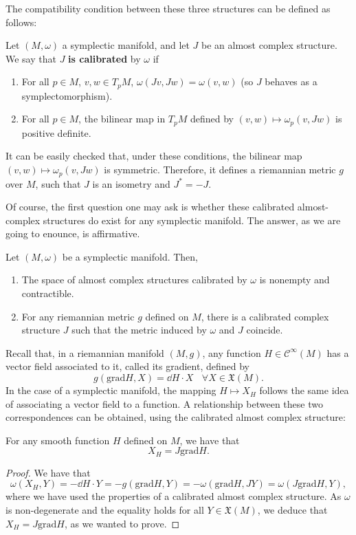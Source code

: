 The compatibility condition between these three structures can be defined as follows:

\begin{deff} \label{definition:calibrated_almost_complex}
Let $(M,\omega)$ a symplectic manifold, and let $J$ be an almost complex structure. We say that $J$ {\bf is calibrated} by $\omega$ if

\begin{enumerate}
	\item For all $p \in M$, $v,w \in T_pM$, $\omega(Jv,Jw) = \omega(v,w)$ (so $J$ behaves as a symplectomorphism).
	\item For all $p \in M$, the bilinear map in $T_pM$ defined by $(v,w) \mapsto \omega_p(v,Jw)$ is positive definite.
\end{enumerate}
\end{deff}

It can be easily checked that, under these conditions, the bilinear map $(v,w) \mapsto \omega_p(v,Jw)$ is symmetric. Therefore, it defines a riemannian metric $g$ over $M$, such that $J$ is an isometry and $J^{\ast} = - J$.

Of course, the first question one may ask is whether these calibrated almost-complex structures do exist for any symplectic manifold. The answer, as we are going to enounce, is affirmative.

\begin{prop} Let $(M,\omega)$ be a symplectic manifold. Then,

\begin{enumerate}
	\item The space of almost complex structures calibrated by $\omega$ is nonempty and contractible.
	\item For any riemannian metric $g$ defined on $M$, there is a calibrated complex structure $J$ such that the metric induced by $\omega$ and $J$ coincide.
\end{enumerate}
\end{prop}

Recall that, in a riemannian manifold $(M,g)$, any function $H \in \mathcal{C}^{\infty}(M)$ has a vector field associated to it, called its gradient, defined by
$$g(\text{grad}H, X) = \dd H \cdot X \ \ \ \ \forall X \in \mathfrak{X}(M) .$$
In the case of a symplectic manifold, the mapping $H \mapsto X_H$ follows the same idea of associating a vector field to a function. A relationship between these two correspondences can be obtained, using the calibrated almost complex structure:

\begin{prop} \label{prop:symplectic_gradient}
For any smooth function $H$ defined on $M$, we have that
$$X_H = J \text{grad}H .$$
\end{prop}

\begin{proof}
We have that
$$\omega(X_H,Y) = - \dd H \cdot Y = - g(\text{grad}H,Y) = - \omega(\text{grad}H,JY) = \omega(J \text{grad}H, Y) ,$$
where we have used the properties of a calibrated almost complex structure. As $\omega$ is non-degenerate and the equality holds for all $Y \in \mathfrak{X}(M)$, we deduce that $X_H = J \text{grad}H$, as we wanted to prove.
\end{proof}
